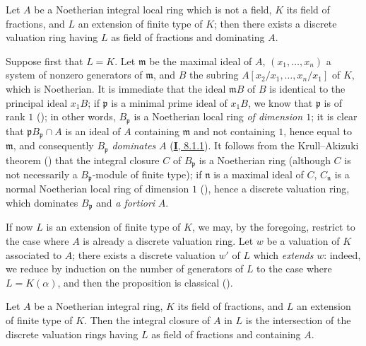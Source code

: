 \begin{proposition}[7.1.7]
\label{II.7.1.7}
Let $A$ be a Noetherian integral local ring which is not a field, $K$ its
field of fractions, and $L$ an extension of finite type of $K$; then there
exists a discrete valuation ring having $L$ as field of fractions and
dominating $A$.
\end{proposition}

Suppose first that $L=K$. Let $\mathfrak{m}$ be the maximal ideal of $A$,
$(x_1,\ldots,x_n)$ a system of nonzero generators of $\mathfrak{m}$,
and $B$ the subring
$A[x_2/x_1,\ldots,x_n/x_1]$ of $K$, which is Noetherian. It is immediate that
the ideal $\mathfrak{m}B$ of $B$ is identical to the principal ideal $x_1B$;
if $\mathfrak{p}$ is a minimal prime ideal of $x_1B$, we know that
$\mathfrak{p}$ is of rank $1$ (\cite[vol.~I, p.~277]{I-13}); in other words,
$B_{\mathfrak{p}}$ is a Noetherian local ring \emph{of dimension $1$};
it is clear that
$\mathfrak{p}B_{\mathfrak{p}}\cap A$ is an ideal of $A$ containing
$\mathfrak{m}$ and not containing $1$, hence equal to $\mathfrak{m}$, and
consequently $B_{\mathfrak{p}}$ \emph{dominates} $A$
(\hyperref[I.8.1.1]{\textbf{I}, 8.1.1}). It follows from the Krull--Akizuki theorem
(\cite[p.~293]{II-25}) that the integral closure $C$ of $B_{\mathfrak{p}}$
is a Noetherian ring (although $C$ is not necessarily a
$B_{\mathfrak{p}}$-module of finite type); if $\mathfrak{n}$ is a maximal
ideal of $C$, $C_{\mathfrak{n}}$ is a normal Noetherian local ring of
dimension $1$ (\cite[p.~295]{II-25}), hence a discrete valuation ring,
which dominates $B_{\mathfrak{p}}$ and \emph{a fortiori} $A$.

If now $L$ is an extension of finite type of $K$, we may, by the
foregoing, restrict to the case where $A$ is already a discrete
valuation ring. Let $w$ be a valuation of $K$ associated to $A$; there exists a
discrete valuation $w'$ of $L$ which \emph{extends} $w$: indeed, we reduce
by induction on the number of generators of $L$ to the case where
$L=K(\alpha)$, and then the proposition is classical
(\cite[p.~106]{II-24}).

\begin{corollary}[7.1.8]
\label{II.7.1.8}
Let $A$ be a Noetherian integral ring, $K$ its field of fractions, and $L$ an
extension of finite type of $K$. Then the integral closure of $A$ in $L$
is the intersection of the discrete valuation rings having $L$ as field of
fractions and containing $A$.
\end{corollary}

